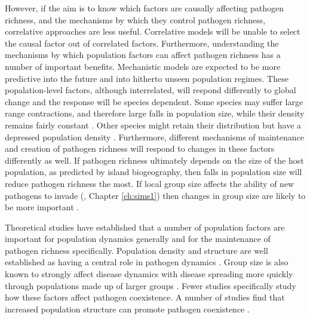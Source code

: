 However, if the aim is to know which factors are causally affecting pathogen richness, and the mechanisms by which they control pathogen richness, correlative approaches are less useful.
Correlative models will be unable to select the causal factor out of correlated factors.
Furthermore, understanding the mechanisms by which population factors can affect pathogen richness has a number of important benefits.
Mechanistic models are expected to be more predictive into the future and into hitherto unseen population regimes.
These popalation-level factors, although interrelated, will respond differently to global change and the response will be species dependent.
Some species may suffer large range contractions, and therefore large falls in population size, while their density remains fairly constant \cite{thomas2004extinction}.
Other species might retain their distribution but have a depressed population density \cite{craigie2010large}.
Furthermore, different mechanisms of maintenance and creation of pathogen richness will respond to changes in these factors differently as well.
If pathogen richness ultimately depends on the size of the host population, as predicted by island biogeography, then falls in population size will reduce pathogen richness the most.
If local group size affects the ability of new pathogens to invade (\textcite{nunn2003comparative}, Chapter \ref{ch:sims1}) then changes in group size are likely to be more important \cite{lehmann2010apes, zunino2007habitat, manor2003impact, atwood2006influence}.






Theoretical studies have established that a number of population factors are important for population dynamics generally and for the maintenance of pathogen richness specifically.
Population density and structure are well established as having a central role in pathogen dynamics \cite{colizza2007invasion, barthelemy2010fluctuation, wu2013threshold, may1979population, anderson1979population}.
Group size is also known to strongly affect disease dynamics with disease spreading more quickly through populations made up of larger groups \cite{colizza2007invasion}.
Fewer studies specifically study how these factors affect pathogen coexistence.
A number of studies find that increased population structure can promote pathogen coexistence \cite{qiu2013vector, allen2004sis, nunes2006localized}.


